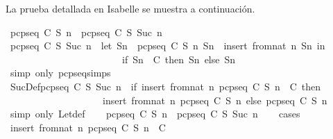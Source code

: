 \begin{isabellebody}
\begin{isamarkuptext}
  La prueba detallada en Isabelle se muestra a continuación.%
\end{isamarkuptext}\isamarkuptrue%
\isamarkupfalse%
\ {\isachardoublequoteopen}pcp{\isacharunderscore}seq\ C\ S\ n\ {\isasymsubseteq}\ pcp{\isacharunderscore}seq\ C\ S\ {\isacharparenleft}Suc\ n{\isacharparenright}{\isachardoublequoteclose}\isanewline
%
\isadelimproof
%
\endisadelimproof
%
\isatagproof
{}\isamarkupfalse%
\ {\isacharminus}\isanewline
\ \ \isamarkupfalse%
\ {\isachardoublequoteopen}pcp{\isacharunderscore}seq\ C\ S\ {\isacharparenleft}Suc\ n{\isacharparenright}\ {\isacharequal}\ {\isacharparenleft}let\ Sn\ {\isacharequal}\ pcp{\isacharunderscore}seq\ C\ S\ n{\isacharsemicolon}\ Sn{}\ {\isacharequal}\ insert\ {\isacharparenleft}from{\isacharunderscore}nat\ n{\isacharparenright}\ Sn\ in\isanewline
\ \ \ \ \ \ \ \ \ \ \ \ \ \ \ \ \ \ \ \ \ \ \ \ if\ Sn{}\ {\isasymin}\ C\ then\ Sn{}\ else\ Sn{\isacharparenright}{\isachardoublequoteclose}\ \isanewline
\ \ \ \ \isamarkupfalse%
\ {\isacharparenleft}simp\ only{\isacharcolon}\ pcp{\isacharunderscore}seq{\isachardot}simps{\isacharparenleft}{}{\isacharparenright}{\isacharparenright}\isanewline
\ \ \isamarkupfalse%
\ \isamarkupfalse%
\ SucDef{\isacharcolon}{\isachardoublequoteopen}pcp{\isacharunderscore}seq\ C\ S\ {\isacharparenleft}Suc\ n{\isacharparenright}\ {\isacharequal}\ {\isacharparenleft}if\ insert\ {\isacharparenleft}from{\isacharunderscore}nat\ n{\isacharparenright}\ {\isacharparenleft}pcp{\isacharunderscore}seq\ C\ S\ n{\isacharparenright}\ {\isasymin}\ C\ then\ \isanewline
\ \ \ \ \ \ \ \ \ \ \ \ \ \ \ \ \ \ \ \ insert\ {\isacharparenleft}from{\isacharunderscore}nat\ n{\isacharparenright}\ {\isacharparenleft}pcp{\isacharunderscore}seq\ C\ S\ n{\isacharparenright}\ else\ pcp{\isacharunderscore}seq\ C\ S\ n{\isacharparenright}{\isachardoublequoteclose}\ \isanewline
\ \ \ \ \isamarkupfalse%
\ {\isacharparenleft}simp\ only{\isacharcolon}\ Let{\isacharunderscore}def{\isacharparenright}\isanewline
\ \ \isamarkupfalse%
\ {\isachardoublequoteopen}pcp{\isacharunderscore}seq\ C\ S\ n\ {\isasymsubseteq}\ pcp{\isacharunderscore}seq\ C\ S\ {\isacharparenleft}Suc\ n{\isacharparenright}{\isachardoublequoteclose}\isanewline
\ \ \isamarkupfalse%
\ {\isacharparenleft}cases{\isacharparenright}\isanewline
\ \ \ \ \isamarkupfalse%
\ {}{\isacharcolon}{\isachardoublequoteopen}insert\ {\isacharparenleft}from{\isacharunderscore}nat\ n{\isacharparenright}\ {\isacharparenleft}pcp{\isacharunderscore}seq\ C\ S\ n{\isacharparenright}\ {\isasymin}\ C{\isachardoublequoteclose}\isanewline

\end{isabellebody}
